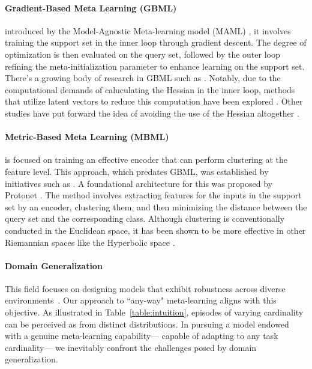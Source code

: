 \documentclass[letterpaper]{article} %
\begin{document}
\paragraph{Gradient-Based Meta Learning (GBML)} %
 introduced by the Model-Agnostic Meta-learning model (MAML) \cite{episodic:GBML:MAML}, it involves training the support set in the inner loop through gradient descent. The degree of optimization is then evaluated on the query set, followed by the outer loop refining the meta-initialization parameter to enhance learning on the support set. %
There's a growing body of research in GBML
such as \cite{episodic:GBML:ANIL, episodic:GBML:imaml, episodic:GBML:warpgrad, episodic:GBML:Reptile}. Notably, due to the computational demands of caluculating the Hessian in the inner loop, %
methods that utilize latent vectors to reduce this computation %
have been explored \cite{episodic:GBML:LEO}. Other studies have put forward the idea of %
avoiding the use of the Hessian altogether \cite{episodic:GBML:ANIL, episodic:GBML:Reptile, episodic:GBML:MAML}.

\paragraph{Metric-Based Meta Learning (MBML)} is focused on training an effective encoder that can perform clustering at the feature level. This approach, which predates GBML, was established by initiatives such as \cite{label_equiv:matchingnetwork}. 
A foundational architecture for this was proposed by Protonet \cite{episodic:MBML:Protonet}. The method involves extracting features for the inputs in the support set by an encoder, clustering them, and then minimizing the distance between the query set and the corresponding class. Although clustering is conventionally conducted in the Euclidean space, it has been shown to be more effective in other Riemannian spaces like the Hyperbolic space \cite{episodic:MBML:Hyperbolic}.

\paragraph{Domain Generalization} 
This field focuses on designing models that exhibit robustness across diverse environments~\cite{DG:Gunbon0,DG:Gunbon1}. Our approach to ``any-way" meta-learning aligns with this objective. As illustrated in Table~\ref{table:intuition}, episodes of varying cardinality can be perceived as from distinct distributions. In pursuing a model endowed with a genuine meta-learning capability— capable of adapting to any task cardinality— we inevitably confront the challenges posed by domain generalization.
\end{document}
